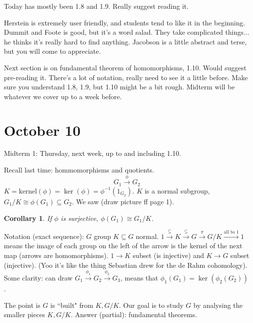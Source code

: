 \documentclass{article}
\theoremstyle{plain}
\newtheorem{corollary}{Corollary}
\theoremstyle{remark}
\begin{document}
Today has mostly been 1.8 and 1.9.
Really suggest reading it.

Herstein is extremely user friendly, and students tend to like it in the beginning.
Dummit and Foote is good, but it's a word salad.
They take complicated things... he thinks it's really hard to find anything.
Jacobson is a little abstract and terse, but you will come to appreciate.

Next section is on fundamental theorem of homomorphisms, 1.10.
Would suggest pre-reading it.
There's a lot of notation, really need to see it a little before.
Make sure you understand 1.8, 1.9, but 1.10 might be a bit rough.
Midterm will be whatever we cover up to a week before.

\section{October 10}
Midterm 1: Thursday, next week, up to and including 1.10.

Recall last time: hommomorphisms and quotients.
\[
	G_1 \xrightarrow{\phi} G_2
\]
$K = \mathrm{kernel}(\phi) = \ker(\phi) = \phi^{-1}(1_{G_2})$.
$K$ is a normal subgroup, $G_1 / K \cong \phi(G_1) \subseteq G_2$.
We saw (draw picture ff page 1).

\begin{corollary}
	If $\phi$ is surjective, $\phi(G_1) \cong G_1/K$.
\end{corollary}
Notation (exact sequence): $G$ group $K \subseteq G$ normal.
$1 \xrightarrow{\subseteq} K \xrightarrow{\subseteq} G \xrightarrow{\pi} G/K \xrightarrow{\text{all to }1}1$
means the image of each group on the left of the arrow
is the kernel of the next map (arrows are homomorphisms).
$1 \to K$ subset (is injective)
and $K \to G$ subset (injective).
(Yoo it's like the thing Sebastian drew for the de Rahm cohomology).
Some clarity: can draw $G_1 \xrightarrow{\phi_1} G_2 \xrightarrow{\phi_2} G_3$,
means that $\phi_1(G_1) = \ker(\phi_2(G_2))$.

The point is $G$ is ``built" from $K, G/K$.
Our goal is to study $G$ by analysing the smaller pieces $K, G/K$.
Answer (partial): fundamental theorems.
\end{document}
